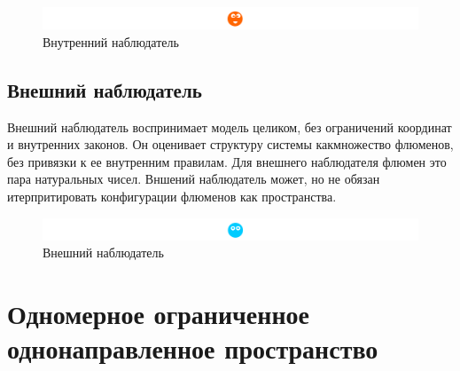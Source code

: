 \documentclass[final]{article}
\begin{document}
            \begin{figure}[H]
                \centering
                \includegraphics[width=\textwidth]{./internal-observer.png}
                \caption{Внутренний наблюдатель}
                \label{fig:image}
            \end{figure}

        \subsection{Внешний наблюдатель}

            Внешний наблюдатель воспринимает модель целиком, без ограничений 
            координат и внутренних законов. Он оценивает структуру системы 
            какмножество флюменов, без привязки к ее внутренним правилам. Для 
            внешнего наблюдателя флюмен это пара натуральных чисел. Вншений 
            наблюдатель может, но не обязан итерпритировать конфигурации флюменов 
            как пространства.

            \begin{figure}[H]
                \centering
                \includegraphics[width=\textwidth]{./external-observer.png}
                \caption{Внешний наблюдатель}
                \label{fig:image}
            \end{figure}

    \section{Одномерное ограниченное однонаправленное пространство}
\end{document}
